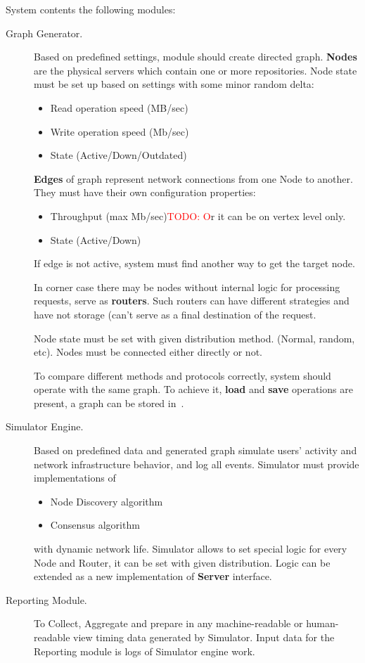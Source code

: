 \documentclass[12pt,oneside]{article}
\newcommand{\todo}[1]{\textcolor{red}{TODO: #1}}
\begin{document}
System contents the following modules:
\begin{description}
    \item[Graph Generator.]
    Based on predefined settings, module should create directed graph. \textbf{Nodes} are the physical servers which contain one or more repositories. Node state must be set up based on settings with some minor random delta:
    \begin{itemize}
        \item Read operation speed (MB/sec)
        \item Write operation speed (Mb/sec)
        \item State (Active/Down/Outdated)
    \end{itemize}
    \textbf{Edges} of graph represent network connections from one Node to another. They must have their own configuration properties:
    \begin{itemize}
        \item Throughput (max Mb/sec)\todo Or it can be on vertex level only.
        \item State (Active/Down)
    \end{itemize}
    If edge is not active, system must find another way to get the target node.\par
    In corner case there may be nodes without internal logic for processing requests, serve as \textbf{routers}. Such routers can have different strategies and have not storage (can't serve as a final destination of the request.\par
    Node state must be set with given distribution method. (Normal, random, etc). Nodes must be connected either directly or not.\par

    To compare different methods and protocols correctly, system should operate with the same graph. To achieve it, \textbf{load} and \textbf{save} operations are present, a graph can be stored in~\cite{dot}.

    \item[Simulator Engine.]
    Based on predefined data and generated graph simulate users' activity and network infrastructure behavior, and log all events. Simulator must provide implementations of
    \begin{itemize}
        \item Node Discovery algorithm
        \item Consensus algorithm
    \end{itemize}
    with dynamic network life.
    Simulator allows to set special logic for every Node and Router, it can be set with given distribution.
    Logic can be extended as a new implementation of \textbf{Server} interface.

    \item[Reporting Module.]
    To Collect, Aggregate and prepare in any machine-readable or human-readable view timing data generated by Simulator. Input data for the Reporting module is logs of Simulator engine work.

\end{description}

\printbibliography%
\end{document}
